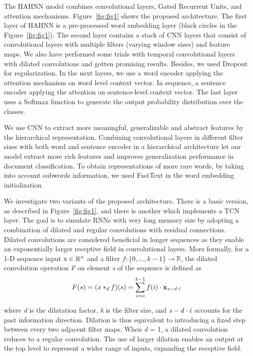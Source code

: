 \documentclass[runningheads]{llncs}
\begin{document}
The HAHNN model combines convolutional layers, Gated Recurrent Units, and attention mechanisms. Figure~\ref{fig:fig1} shows the proposed architecture. The first layer of HAHNN is a pre-processed word embedding layer (black circles in the Figure~\ref{fig:fig1}). The second layer contains a stack of CNN layers that consist of convolutional layers with multiple filters (varying window sizes) and feature maps. We also have performed some trials with temporal convolutional layers with dilated convolutions and gotten promising results. Besides, we used Dropout for regularization. In the next layers, we use a word encoder applying the attention mechanism on word level context vector. In sequence, a sentence encoder applying the attention on sentence-level context vector. The last layer uses a Softmax function to generate the output probability distribution over the classes. 

We use CNN to extract more meaningful, generalizable and abstract features by the hierarchical representation. Combining convolutional layers in different filter sizes with both word and sentence encoder in a hierarchical architecture let our model extract more rich features and improves generalization performance in document classification. To obtain representations of more rare words, by taking into account subwords information, we used FastText \cite{c3} in the word embedding initialization.

We investigate two variants of the proposed architecture. There is a basic version, as described in Figure~\ref{fig:fig1}, and there is another which implements a TCN \cite{c6} layer. The goal is to simulate RNNs with very long memory size by adopting a combination of dilated and regular convolutions with residual connections. Dilated convolutions are considered beneficial in longer sequences as they enable an exponentially larger receptive field in convolutional layers. More formally, for a 1-D sequence input $\mathrm{ x \in \mathbb{R}^{\it{n}} }$ and a filter $f : \{0,..., k-1\}     \rightarrow \mathbb{R}$, the dilated convolution operation \textit{F} on element \textit{s} of the sequence is defined as \\[-8mm]

\begin{equation}
    F(s) = (x*_df)(s) = \sum_{i=o}^{k-1}f(i) \cdot \bf{x}_{\it{s - d \cdot i}}
\end{equation}

\vspace{-1mm}

where \textit{d} is the dilatation factor, \textit{k} is the filter size, and $\it{s - d \cdot i}$ accounts for the past information direction. Dilation is thus equivalent to introducing a fixed step between every two adjacent filter maps. When \textit{d} = 1, a dilated convolution reduces to a regular convolution. The use of larger dilation enables an output at the top level to represent a wider range of inputs, expanding the receptive field. \\[-9mm]
\end{document}
